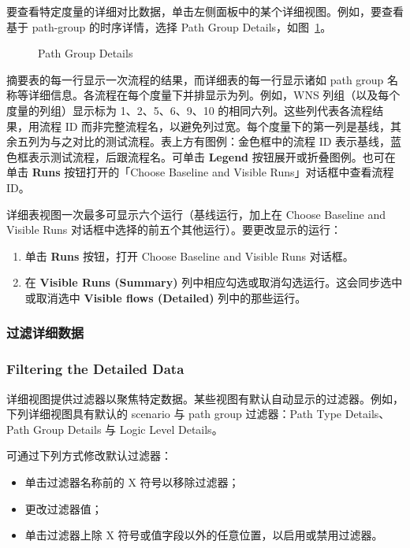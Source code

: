 要查看特定度量的详细对比数据，单击左侧面板中的某个详细视图。例如，要查看基于 path-group 的时序详情，选择 Path Group Details，如图~\ref{fig:path-group-details}。

\begin{figure}[htbp]
\centering
{}
\caption{Path Group Details}
\label{fig:path-group-details}
\end{figure}

摘要表的每一行显示一次流程的结果，而详细表的每一行显示诸如 path group 名称等详细信息。各流程在每个度量下并排显示为列。例如，WNS 列组（以及每个度量的列组）显示标为 1、2、5、6、9、10 的相同六列。这些列代表各流程结果，用流程 ID 而非完整流程名，以避免列过宽。每个度量下的第一列是基线，其余五列为与之对比的测试流程。表上方有图例：金色框中的流程 ID 表示基线，蓝色框表示测试流程，后跟流程名。可单击 \textbf{Legend} 按钮展开或折叠图例。也可在单击 \textbf{Runs} 按钮打开的「Choose Baseline and Visible Runs」对话框中查看流程 ID。

详细表视图一次最多可显示六个运行（基线运行，加上在 Choose Baseline and Visible Runs 对话框中选择的前五个其他运行）。要更改显示的运行：
\begin{enumerate}
  \item 单击 \textbf{Runs} 按钮，打开 Choose Baseline and Visible Runs 对话框。
  \item 在 \textbf{Visible Runs (Summary)} 列中相应勾选或取消勾选运行。这会同步选中或取消选中 \textbf{Visible flows (Detailed)} 列中的那些运行。
\end{enumerate}

\subsubsection{过滤详细数据}
\subsubsection*{Filtering the Detailed Data}

详细视图提供过滤器以聚焦特定数据。某些视图有默认自动显示的过滤器。例如，下列详细视图具有默认的 scenario 与 path group 过滤器：Path Type Details、Path Group Details 与 Logic Level Details。

可通过下列方式修改默认过滤器：
\begin{itemize}
  \item 单击过滤器名称前的 X 符号以移除过滤器；
  \item 更改过滤器值；
  \item 单击过滤器上除 X 符号或值字段以外的任意位置，以启用或禁用过滤器。
\end{itemize}

